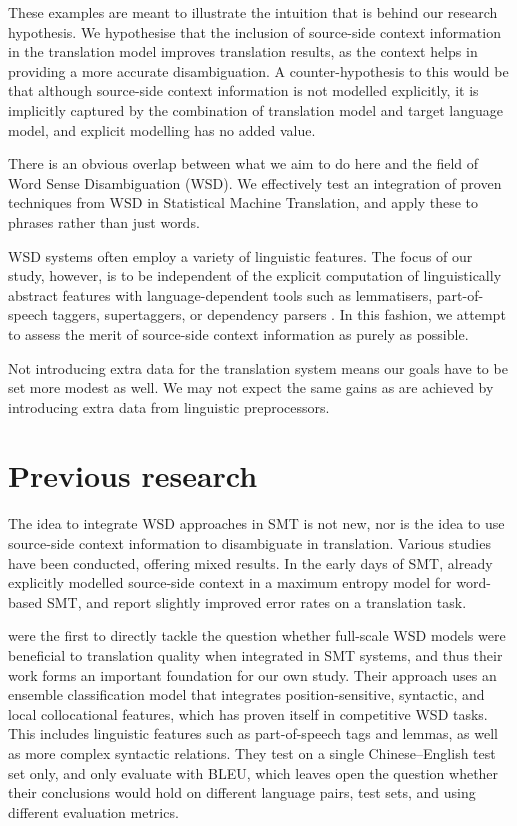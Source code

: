 \documentclass[smallextended]{svjour3}       %
\theoremstyle{break}
\begin{document}
These examples are meant to illustrate the intuition that is behind our
research hypothesis. We hypothesise that the inclusion of source-side context
information in the translation model improves translation results, as the
context helps in providing a more accurate disambiguation. A counter-hypothesis
to this would be that although source-side context information is not modelled
explicitly, it is implicitly captured by the combination of translation model
and target language model, and explicit modelling has no added value.

There is an obvious overlap between what we aim to do here and the field of
Word Sense Disambiguation (WSD). We effectively test an integration of proven
techniques from WSD in Statistical Machine Translation, and apply these to
phrases rather than just words.

WSD systems often employ a variety of linguistic features. The focus of our
study, however, is to be independent of the explicit computation of
linguistically abstract features with language-dependent tools such as
lemmatisers, part-of-speech taggers, supertaggers, or dependency parsers
\cite{Rejwanul+11}. 
In this fashion, we attempt to assess the merit of source-side
context information as purely as possible.

Not introducing extra data for the translation system means our goals have to
be set more modest as well. We may not expect the same gains as are achieved by
introducing extra data from linguistic preprocessors.

\section{Previous research}

The idea to integrate WSD approaches in SMT is not new, nor is the idea to use
source-side context information to disambiguate in translation. Various studies
have been conducted, offering mixed results. In the early days of SMT,
\cite{GarciaVarea+02} already explicitly modelled source-side context in a
maximum entropy model for word-based SMT, and report slightly improved error
rates on a translation task.

\cite{CarpuatWu05} were the first to directly tackle the question whether
full-scale WSD models were beneficial to translation quality when integrated in
SMT systems, and thus their work forms an important foundation for our own study.
Their approach uses an ensemble classification model that integrates
position-sensitive, syntactic, and local collocational features, which has
proven itself in competitive WSD tasks. This includes linguistic features such
as part-of-speech tags and lemmas, as well as more complex syntactic relations.
They test on a single Chinese--English test set only, and only
evaluate with BLEU,
which leaves open the question whether their conclusions would hold on
different language pairs, test sets, and using different evaluation metrics.
\end{document}
